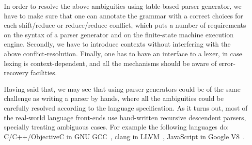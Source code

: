 In order to resolve the above ambiguities using table-based parser
generator, we have to make sure that one can annotate the grammar with a
correct choices for each shift/reduce or reduce/reduce conflict, which
puts a number of requirements on the syntax of a parser generator and on
the finite-state machine execution engine.  Secondly, we have to
introduce contexts without interfering with the above
conflict-resolution.  Finally, one has to have an interface to a lexer,
in case lexing is context-dependent, and all the mechanisms should be
aware of error-recovery facilities.

Having said that, we may see that using parser generators could be of
the same challenge as writing a parser by hands, where all the
ambiguities could be carefully resolved according to the language
specification.  As it turns out, most of the real-world language
front-ends use hand-written recursive descendent parsers, specially
treating ambiguous cases.  For example the following languages do:
C/C++/ObjectiveC in GNU GCC~\cite{gcc}, clang in LLVM~\cite{clang}, 
JavaScript in Google V8~\cite{v8}.

